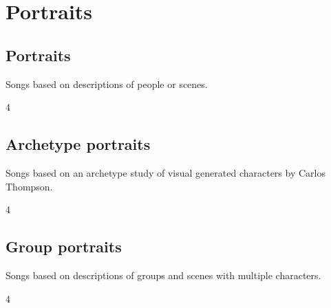 \documentclass[a4paper,landscape]{memoir}
\begin{document}
\part{Portraits}

\chapter{Portraits}
Songs based on descriptions of people or scenes.
\clearpage\begin{multicols*}{4}













\end{multicols*}

\chapter{Archetype portraits}
Songs based on an archetype study of visual generated characters by Carlos Thompson.
\clearpage\begin{multicols*}{4}














\end{multicols*}

\chapter{Group portraits}
Songs based on descriptions of groups and scenes with multiple characters.
\clearpage\begin{multicols*}{4}










\end{multicols*}
\end{document}
